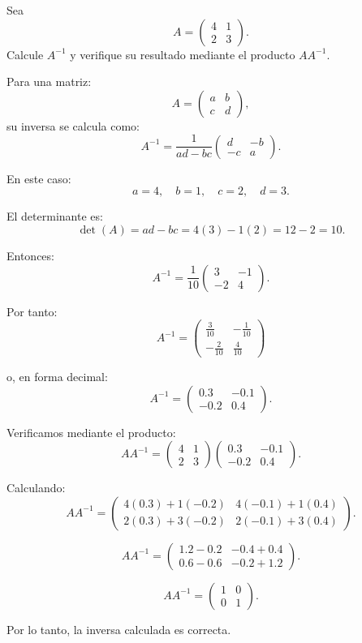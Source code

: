 \documentclass[11pt,respuestas,a4]{aleph-examen}
\begin{document}
\begin{preguntas}
\item
Sea 
\[
A=
\begin{pmatrix}
4 & 1\\
2 & 3
\end{pmatrix}.
\]
Calcule $A^{-1}$ y verifique su resultado mediante el producto $AA^{-1}$.

\begin{respuesta}
Para una matriz:
\[
A=
\begin{pmatrix}
a & b\\
c & d
\end{pmatrix},
\]
su inversa se calcula como:
\[
A^{-1}=\frac{1}{ad-bc}
\begin{pmatrix}
d & -b\\
-c & a
\end{pmatrix}.
\]

En este caso:
\[
a=4,\quad b=1,\quad c=2,\quad d=3.
\]

El determinante es:
\[
\det(A)=ad-bc=4(3)-1(2)=12-2=10.
\]

Entonces:
\[
A^{-1}=\frac{1}{10}
\begin{pmatrix}
3 & -1\\
-2 & 4
\end{pmatrix}.
\]

Por tanto:
\[
\boxed{
A^{-1}=
\begin{pmatrix}
\frac{3}{10} & -\frac{1}{10}\\
-\frac{2}{10} & \frac{4}{10}
\end{pmatrix}
}
\]

o, en forma decimal:
\[
\boxed{
A^{-1}=
\begin{pmatrix}
0.3 & -0.1\\
-0.2 & 0.4
\end{pmatrix}
}.
\]

Verificamos mediante el producto:
\[
AA^{-1}=
\begin{pmatrix}
4 & 1\\
2 & 3
\end{pmatrix}
\begin{pmatrix}
0.3 & -0.1\\
-0.2 & 0.4
\end{pmatrix}.
\]

Calculando:
\[
AA^{-1}=
\begin{pmatrix}
4(0.3)+1(-0.2) & 4(-0.1)+1(0.4)\\
2(0.3)+3(-0.2) & 2(-0.1)+3(0.4)
\end{pmatrix}.
\]

\[
AA^{-1}=
\begin{pmatrix}
1.2-0.2 & -0.4+0.4\\
0.6-0.6 & -0.2+1.2
\end{pmatrix}.
\]

\[
AA^{-1}=
\begin{pmatrix}
1 & 0\\
0 & 1
\end{pmatrix}.
\]

Por lo tanto, la inversa calculada es correcta.
\end{respuesta}







\end{preguntas}
\end{document}
